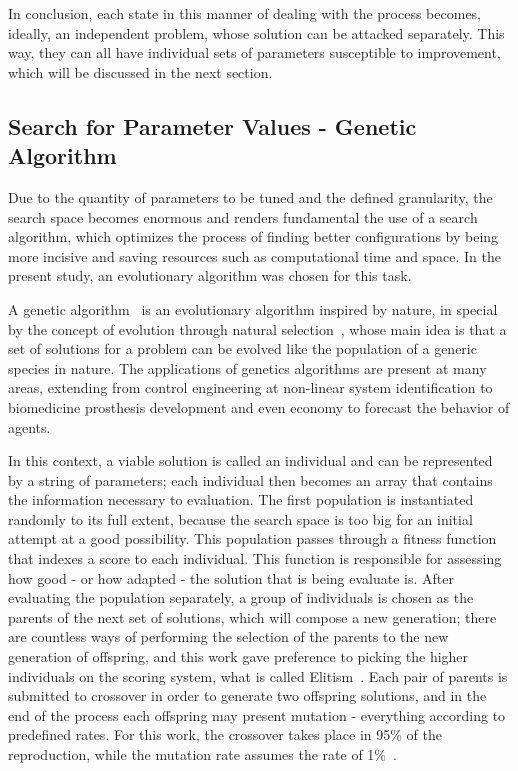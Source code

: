 	In conclusion, each state in this manner of dealing with the process becomes, ideally, an independent problem,
	whose solution can be attacked separately. This way, they can all have individual sets of parameters susceptible
	to improvement, which will be discussed in the next section.
	
\subsection{Search for Parameter Values - Genetic Algorithm} \label{subsec:GA}
	
	Due to the quantity of parameters to be tuned and the defined granularity, the search space becomes enormous and
	renders fundamental the use of a search algorithm, which optimizes the process of finding better configurations
	by being more incisive and saving resources such as computational time and space. In the present study, an
	evolutionary algorithm was chosen for this task.
	
	A genetic algorithm~\cite{GA} is an evolutionary algorithm inspired by nature, in special by the concept of
	evolution through natural selection~\cite{Darwin}, whose main idea is that a set of solutions for a problem can
	be evolved like the population of a generic species in nature. The applications of genetics algorithms are
	present at many areas, extending from control engineering at non-linear system identification to biomedicine
	prosthesis development and even economy to forecast the behavior of agents.
	
	In this context, a viable solution is called an individual and can be represented by a string of parameters; each
	individual then becomes an array that contains the information necessary to evaluation. The first population is
	instantiated randomly to its full extent, because the search space is too big for an initial attempt at a good
	possibility. This population passes through a fitness function that indexes a score to each individual. This
	function is responsible for assessing how good - or how adapted - the solution that is being evaluate is. After
	evaluating the population separately, a group of individuals is chosen as the parents of the next set of
	solutions, which will compose a new generation; there are countless ways of performing the selection of the
	parents to the new generation of offspring, and this work gave preference to picking the higher individuals on the
	scoring system, what is called Elitism~\cite{ELITISM}. Each pair of parents is submitted to
	crossover in order to generate two offspring solutions, and in the end of the process each offspring may
	present mutation - everything according to predefined rates. For this work, the crossover takes place in 95\% of
	the reproduction, while the mutation rate assumes the rate of 1\%~\cite{RATES}.
	
